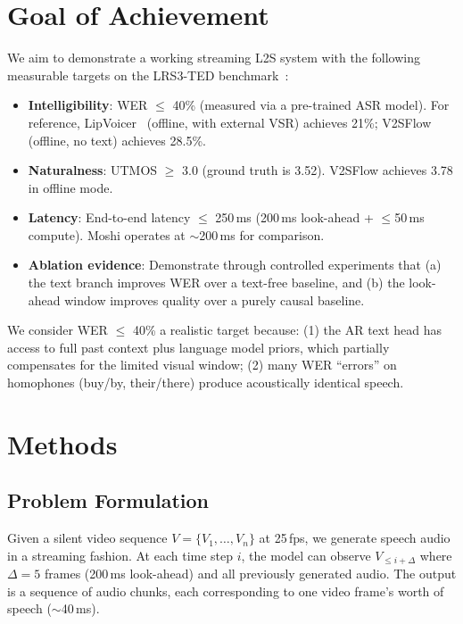 \documentclass{article}
\begin{document}
\section{Goal of Achievement}

We aim to demonstrate a working streaming L2S system with the following measurable targets on the LRS3-TED benchmark~\cite{lrs3}:

\begin{itemize}
    \item \textbf{Intelligibility}: WER $\leq$ 40\% (measured via a pre-trained ASR model). For reference, LipVoicer~\cite{lipvoicer} (offline, with external VSR) achieves 21\%; V2SFlow~\cite{v2sflow} (offline, no text) achieves 28.5\%.
    \item \textbf{Naturalness}: UTMOS $\geq$ 3.0 (ground truth is 3.52). V2SFlow achieves 3.78 in offline mode.
    \item \textbf{Latency}: End-to-end latency $\leq$ 250\,ms (200\,ms look-ahead + $\leq$50\,ms compute). Moshi operates at $\sim$200\,ms for comparison.
    \item \textbf{Ablation evidence}: Demonstrate through controlled experiments that (a) the text branch improves WER over a text-free baseline, and (b) the look-ahead window improves quality over a purely causal baseline.
\end{itemize}

We consider WER $\leq$ 40\% a realistic target because: (1) the AR text head has access to full past context plus language model priors, which partially compensates for the limited visual window; (2) many WER ``errors'' on homophones (buy/by, their/there) produce acoustically identical speech.

\section{Methods}

\subsection{Problem Formulation}

Given a silent video sequence $V = \{V_1, \ldots, V_n\}$ at 25\,fps, we generate speech audio in a streaming fashion. At each time step $i$, the model can observe $V_{\leq i+\Delta}$ where $\Delta{=}5$ frames (200\,ms look-ahead) and all previously generated audio. The output is a sequence of audio chunks, each corresponding to one video frame's worth of speech ($\sim$40\,ms).
\end{document}
